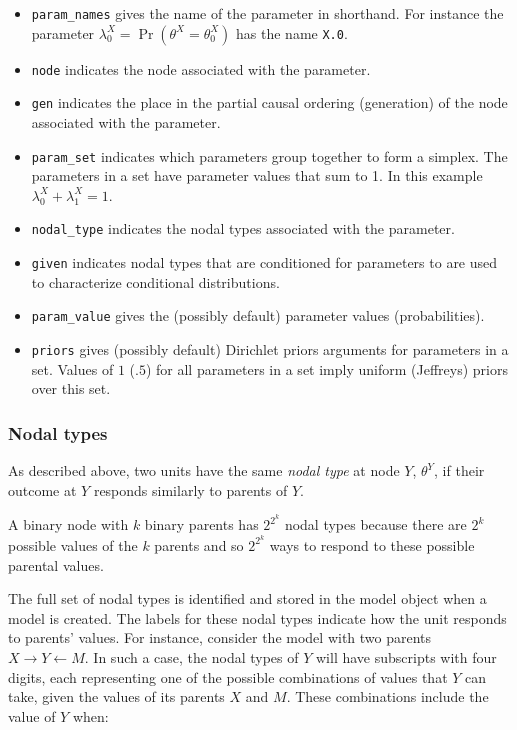 \documentclass[
  11pt,
  article]{jss}
\providecommand{\tightlist}{%
  \setlength{\itemsep}{0pt}\setlength{\parskip}{0pt}}\usepackage{longtable,booktabs,array}
\begin{document}
\begin{itemize}
\tightlist
\item
  \texttt{param\_names} gives the name of the parameter in shorthand.
  For instance the parameter
  \(\lambda^X_0 = \Pr(\theta^X = \theta^X_0)\) has the name
  \texttt{X.0}.
\item
  \texttt{node} indicates the node associated with the parameter.
\item
  \texttt{gen} indicates the place in the partial causal ordering
  (generation) of the node associated with the parameter.
\item
  \texttt{param\_set} indicates which parameters group together to form
  a simplex. The parameters in a set have parameter values that sum to
  1. In this example \(\lambda^X_0 + \lambda^X_1 = 1\).
\item
  \texttt{nodal\_type} indicates the nodal types associated with the
  parameter.
\item
  \texttt{given} indicates nodal types that are conditioned for
  parameters to are used to characterize conditional distributions.
\item
  \texttt{param\_value} gives the (possibly default) parameter values
  (probabilities).
\item
  \texttt{priors} gives (possibly default) Dirichlet priors arguments
  for parameters in a set. Values of \(1\) (\(.5\)) for all parameters
  in a set imply uniform (Jeffreys) priors over this set.
\end{itemize}

\hypertarget{sec-nodal-types}{%
\subsubsection{Nodal types}\label{sec-nodal-types}}

As described above, two units have the same \emph{nodal type} at node
\(Y\), \(\theta^Y\), if their outcome at \(Y\) responds similarly to
parents of \(Y\).

A binary node with \(k\) binary parents has \(2^{2^k}\) nodal types
because there are \(2^k\) possible values of the \(k\) parents and so
\(2^{2^k}\) ways to respond to these possible parental values.

The full set of nodal types is identified and stored in the model object
when a model is created. The labels for these nodal types indicate how
the unit responds to parents' values. For instance, consider the model
with two parents \(X \rightarrow Y \leftarrow M.\) In such a case, the
nodal types of \(Y\) will have subscripts with four digits, each
representing one of the possible combinations of values that \(Y\) can
take, given the values of its parents \(X\) and \(M.\) These
combinations include the value of \(Y\) when:
\end{document}
